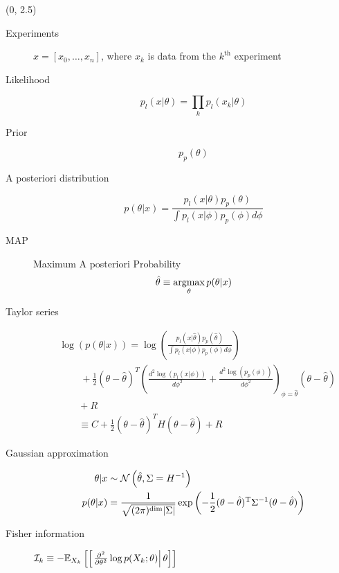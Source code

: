 \documentclass[a0]{a0poster}
\begin{document}
\begin{textblock}{6}(0, 2.5)
  \begin{description}
  \item[Experiments] $x=[x_0,\ldots,x_n]$, where $x_k$ is data from
    the $k^\text{th}$ experiment
  \item[Likelihood]
    \begin{equation*}
      p_l(x|\theta) = \prod_k p_l(x_k|\theta)
    \end{equation*}
  \item[Prior]
    \begin{equation*}
      p_p(\theta)
    \end{equation*}
  \item[A posteriori distribution]
    \begin{equation*}
      p(\theta|x) = \frac{p_l(x|\theta) p_p(\theta)}{\int p_l(x|\phi)
        p_p(\phi) d\phi}
    \end{equation*}
  \item[MAP] Maximum A posteriori Probability
    \begin{equation*}
      \hat \theta \equiv \operatorname*{argmax}_{\theta} p(\theta|x)
    \end{equation*}
  \item[Taylor series]
    \begin{align*}
      &\log \left( p(\theta|x) \right) = \log \left( \frac{p_l(x|\hat \theta)
        p_p(\hat \theta)}{\int p_l(x|\phi) p_p(\phi) d\phi} \right) \\
      &\qquad~+ \frac{1}{2}
        \left( \theta - \hat \theta \right)^T \left(
        \frac{d^2 \log\left( p_l(x|\phi) \right) }{d\phi^2} +
        \frac{d^2 \log \left( p_p(\phi) \right) }{d\phi^2} 
        \right)_{\phi=\hat \theta} \left( \theta - \hat \theta
        \right)\\
      &\qquad + R \\
      &\qquad\equiv C + \frac{1}{2}
        \left( \theta - \hat \theta \right)^T H \left( \theta - \hat \theta \right)
        + R
    \end{align*}
  \item[Gaussian approximation]
    \begin{align*}
      \theta|x &\sim {{\cal N}\left( \hat \theta,\Sigma = H^{-1} \right)}\\
      p(\theta|x) &= \frac{1}{\sqrt{(2\pi)^{\text{dim}}|\Sigma|}} \exp\left(
                    -\frac{1}{2}(\theta-\hat\theta)^\mathrm{T}\Sigma^{-1}
                    (\theta-\hat\theta) \right)
    \end{align*}
  \item[Fisher information]
    $\mathcal{I}_k \equiv -
    \mathbb{E}_{X_k}\left[\left[\left. \frac{\partial^2}{\partial\theta^2} \log
          p(X_k;\theta)\right|\theta \right]\right]$
  \end{description}
\end{textblock}
\end{document}
